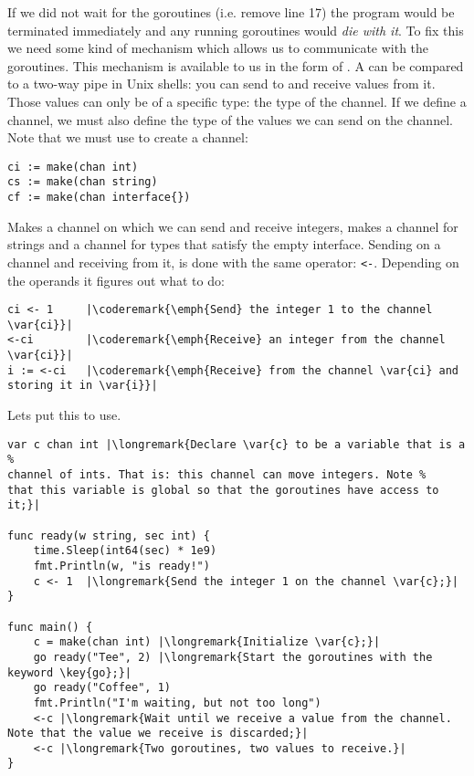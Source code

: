 If we did not wait for the goroutines (i.e. remove line 17) the program
would be terminated immediately and any running goroutines would
\emph{die with it}. 
To fix this we need some kind of mechanism which allows us to
communicate with the goroutines. This mechanism is available
to us in the form of . A
 can be
compared to a two-way pipe in Unix shells: you can send to and receive
values from it. Those values can only be of a specific type: the
type of the channel. If we define a channel, we must also define the
type of the values we can send on the channel. Note that we must use
 to create a channel:
\begin{lstlisting}
ci := make(chan int)
cs := make(chan string)
cf := make(chan interface{})
\end{lstlisting}
Makes  a channel on which we can send and receive integers,
makes  a channel for strings and  a channel for types
that satisfy the empty interface. 
Sending on a channel and receiving from it, is done with the same operator:
\lstinline{<-}. 
Depending on the operands it figures out what to do:
\begin{lstlisting}
ci <- 1	    |\coderemark{\emph{Send} the integer 1 to the channel \var{ci}}|
<-ci	    |\coderemark{\emph{Receive} an integer from the channel \var{ci}}|
i := <-ci   |\coderemark{\emph{Receive} from the channel \var{ci} and storing it in \var{i}}|
\end{lstlisting}
Lets put this to use.
\begin{lstlisting}[numbers=right,caption=Go routines and a channel,label=src:sleeping with channels]
var c chan int |\longremark{Declare \var{c} to be a variable that is a %
channel of ints. That is: this channel can move integers. Note %
that this variable is global so that the goroutines have access to it;}|

func ready(w string, sec int) {
	time.Sleep(int64(sec) * 1e9)
	fmt.Println(w, "is ready!")
	c <- 1	|\longremark{Send the integer 1 on the channel \var{c};}|
}

func main() {
	c = make(chan int) |\longremark{Initialize \var{c};}|
	go ready("Tee", 2) |\longremark{Start the goroutines with the keyword \key{go};}|
	go ready("Coffee", 1)
	fmt.Println("I'm waiting, but not too long")
	<-c |\longremark{Wait until we receive a value from the channel. Note that the value we receive is discarded;}|
	<-c |\longremark{Two goroutines, two values to receive.}|
}
\end{lstlisting}

